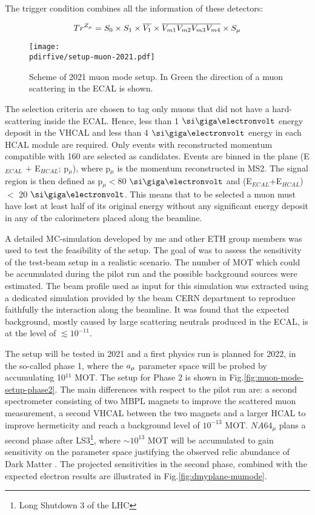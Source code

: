 The trigger condition combines all the information of these detectors:

\begin{equation}
\label{eq:trigger-mumode}
Tr^{Z_{\mu}} = S_0 \times S_1 \times \overline{V_1} \times \overline{V_{m1}}\overline{V_{m2}}\overline{V_{m3}}\overline{V_{m4}}\times S_{\mu}
\end{equation}

\begin{figure}[bth!]
  \centering
  \texttt{[image: \\pdirfive/setup-muon-2021.pdf]}
  \caption[Sketch of muon mode setup 2021 for phase 1]{Scheme of 2021 muon mode setup. In Green the direction of a muon scattering in the ECAL is shown.}
  \label{fig:muon-mode-setup}
\end{figure}

The selection criteria are chosen to tag only muons that did not have a hard-scattering inside the ECAL. Hence, less than 1 $\gev$ energy deposit in the VHCAL and less than 4 $\gev$ energy in each HCAL module are required. Only events with reconstructed momentum compatible with 160 \gev are selected as candidates. Events are binned in the plane (E$_{ECAL}$ + E$_{HCAL}$; p$_{\mu}$), where p$_{\mu}$ is the momentum reconstructed in MS2. The signal region is then defined as p$_{\mu} <$80 $\gev$ and (E$_{ECAL}$+E$_{HCAL}$) $<$ 20 $\gev$. This means that to be selected a muon must have lost at least half of its original energy without any significant energy deposit in any of the calorimeters placed along the beamline.

A detailed MC-simulation developed by me and other ETH group members was used to test the feasibility of the setup. The goal of was to assess the sensitivity of the test-beam setup in a realistic scenario. The number of MOT which could be accumulated during the pilot run and the possible background sources were estimated. The beam profile used as input for this simulation was extracted using a dedicated simulation provided by the beam CERN department to reproduce faithfully the interaction along the beamline. It was found that the expected background, mostly caused by large scattering neutrals produced in the ECAL, is at the level of $\lesssim 10^{-11}$. 

The setup will be tested in 2021 and a first physics run is planned for 2022, in the so-called phase 1, where the $a_{\mu}$ parameter space will be probed by accumulating 10$^{11}$ MOT. The setup for Phase 2 is shown in Fig.\ref{fig:muon-mode-setup-phase2}. The main differences with respect to the pilot run are: a second spectrometer consisting of two MBPL magnets to improve the scattered muon measurement, a second VHCAL between the two magnets and a larger HCAL to improve hermeticity and reach a background level of $10^{-13}$ MOT. $NA64_{\mu}$ plans a second phase after LS3\footnote{Long Shutdown 3 of the LHC}, where $\sim 10^{13}$ MOT will be accumulated to gain sensitivity on the parameter space justifying the observed relic abundance of Dark Matter \cite{Gninenko:2640930}. The projected sensitivities in the second phase, combined with the expected electron results are illustrated in Fig.\ref{fig:dmyplane-mumode}.

